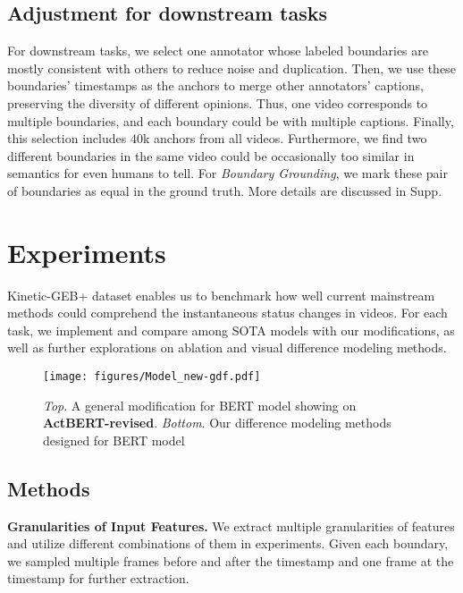 \documentclass[runningheads]{llncs}
\begin{document}
\subsection{Adjustment for downstream tasks}
\label{benchmark_adjust}

For downstream tasks, we select one annotator whose labeled boundaries are mostly consistent with others to reduce noise and duplication. Then, we use these boundaries’ timestamps as the anchors to merge other annotators’ captions, preserving the diversity of different opinions. Thus, one video corresponds to multiple boundaries, and each boundary could be with multiple captions. Finally, this selection includes 40k anchors from all videos. Furthermore, we find two different boundaries in the same video could be occasionally too similar in semantics for even humans to tell. For \textit{Boundary Grounding}, we mark these pair of boundaries as equal in the ground truth. More details are discussed in Supp.






 \section{Experiments}
Kinetic-GEB+ dataset enables us to benchmark how well current mainstream methods could comprehend the instantaneous status changes in videos. For each task, we implement and compare among SOTA models with our modifications, as well as further explorations on ablation and visual difference modeling methods. 




\begin{figure}[t]
\centering
\texttt{[image: figures/Model\_new-gdf.pdf]}
\caption{\textit{Top}. A general modification for BERT model showing on \textbf{ActBERT-revised}. \textit{Bottom}. Our difference modeling methods designed for BERT model}
\label{fig:diff_modeling}
\end{figure}


\subsection{Methods}
\label{experiment_methods}
\textbf{Granularities of Input Features.}
We extract multiple granularities of features and utilize different combinations of them in experiments. Given each boundary, we sampled multiple frames before and after the timestamp and one frame at the timestamp for further extraction.
\end{document}
